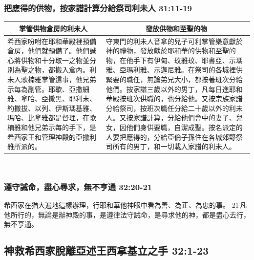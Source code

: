 \subsubsection{把應得的供物，按家譜計算分給祭司利未人 31:11-19}
\begin{table}[H]
\centering
\begin{tabular}{p{6.5cm}|p{10.5cm}}\hline\hline
\multicolumn{1}{c|}{掌管供物倉房的利未人}&\multicolumn{1}{c}{發放供物和至聖的物}\\\hline
希西家吩咐在耶和華殿裡預備倉房，他們就預備了。他們誠心將供物和十分取一之物並分別為聖之物，都搬入倉內。利未人歌楠雅掌管這事，他兄弟示每為副管。耶歇、亞撒細雅、拿哈、亞撒黑、耶利末、約撒拔、以列、伊斯瑪基雅、瑪哈、比拿雅都是督理，在歌楠雅和他兄弟示每的手下，是希西家王和管理神殿的亞撒利雅所派的。 
&守東門的利未人音拿的兒子可利掌管樂意獻於神的禮物，發放獻於耶和華的供物和至聖的物，在他手下有伊甸、玟雅玟、耶書亞、示瑪雅、亞瑪利雅、示迦尼雅。在祭司的各城裡供緊要的職任，無論弟兄大小，都按著班次分給他們。按家譜三歲以外的男丁，凡每日進耶和華殿按班次供職的，也分給他。又按宗族家譜分給祭司，按班次職任分給二十歲以外的利未人。又按家譜計算，分給他們會中的妻子、兒女，因他們身供要職，自潔成聖。按名派定的人要把應得的，分給亞倫子孫住在各城郊野祭司所有的男丁，和一切載入家譜的利未人。\\\hline 
\end{tabular}
\end{table} 


\subsubsection{遵守誡命，盡心尋求，無不亨通 32:20-21}
希西家在猶大遍地這樣辦理，行耶和華他神眼中看為善、為正、為忠的事。 21 凡他所行的，無論是辦神殿的事，是遵律法守誡命，是尋求他的神，都是盡心去行，無不亨通。

\subsection{神救希西家脫離亞述王西拿基立之手 32:1-23}
